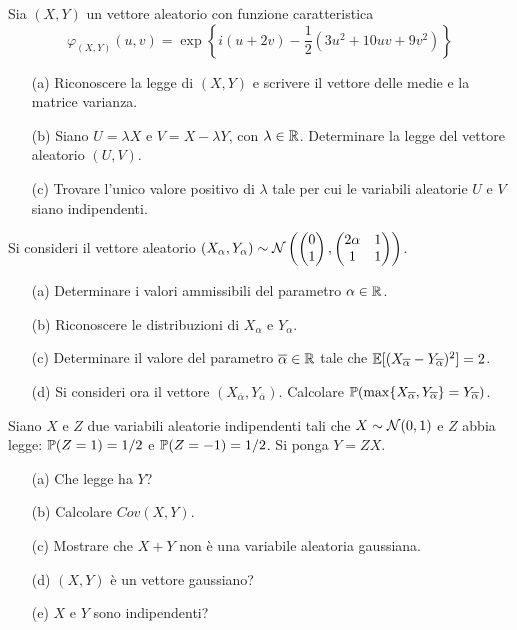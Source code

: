 \Esercizio{} %
Sia $(X,Y)$ un vettore aleatorio con funzione caratteristica
\[
\varphi_{(X,Y)}(u,v)=\exp\left\{i(u+2v)-\frac{1}{2}\left(3u^2+10uv+9v^2\right)  \right\}
\]
\begin{enumerate}
\item [(a)] Riconoscere la legge di $(X,Y)$ e scrivere il vettore delle medie e la matrice varianza.
\item [(b)] Siano $U=\lambda X$ e $V=X-\lambda Y$, con $\lambda\in\mathbb{R}$. Determinare la legge del vettore aleatorio $(U,V)$.
\item [(c)] Trovare l'unico valore positivo di $\lambda$ tale per cui le variabili aleatorie $U$ e $V$ siano indipendenti.
\end{enumerate}

\Esercizio{} %
Si consideri il vettore aleatorio $(X_\alpha,Y_\alpha)\sim\mathcal{N}\left(\begin{pmatrix}
0 \\1
\end{pmatrix},\begin{pmatrix}
2\alpha &1 \\1&1
\end{pmatrix}\right)$.
\begin{enumerate}
\item [(a)] Determinare i valori ammissibili del parametro $\alpha\in\mathbb{R}$.
\item [(b)] Riconoscere le distribuzioni di $X_\alpha$ e $Y_\alpha$.
\item [(c)] Determinare il valore del parametro $\overline{\alpha}\in\mathbb{R}$ tale che $\mathbb{E}[(X_{\overline{\alpha}}-Y_{\overline{\alpha}})^2]=2$.
\item [(d)] Si consideri ora il vettore $(X_{\overline{\alpha}},Y_{\overline{\alpha}})$. Calcolare $\mathbb{P}(\max\{X_{\overline{\alpha}},  Y_{\overline{\alpha}}\}=Y_{\overline{\alpha}})$. 
\end{enumerate}

\Esercizio{} %
Siano $X$ e $Z$ due variabili aleatorie indipendenti tali che $X\sim\mathcal{N}(0,1)$ e $Z$ abbia legge: $\mathbb{P}(Z=1)=1/2$ e $\mathbb{P}(Z=-1)=1/2$. Si ponga $Y=ZX$.
\begin{enumerate}
\item [(a)] Che legge ha $Y$?
\item [(b)] Calcolare $Cov(X,Y)$.
\item [(c)] Mostrare che $X+Y$ non è una variabile aleatoria gaussiana.
\item [(d)] $(X,Y)$ è un vettore gaussiano?
\item [(e)] $X$ e $Y$ sono indipendenti?
\end{enumerate}

